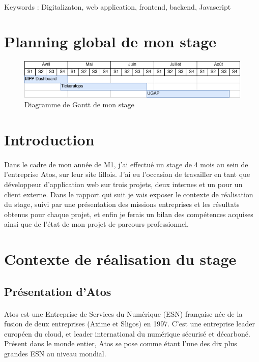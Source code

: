 \documentclass[12pt]{article}
\begin{document}
\begin {sloppypar}
\paragraph{}
Keywords : Digitalizaton, web application, frontend, backend, Javascript
\newpage

\section*{Planning global de mon stage}
\begin{figure}[h]
  \includegraphics[width=\textwidth] {gantt.png}
  \caption {Diagramme de Gantt de mon stage}
\end{figure}
\newpage

\section{Introduction}
\paragraph{}
Dans le cadre de mon année de M1, j'ai effectué un stage de 4 mois au sein de l'entreprise 
Atos, sur leur site lillois. J'ai eu l'occasion de travailler en tant que développeur d'application 
web sur trois projets, deux internes et un pour un client externe. Dans le rapport qui suit je vais exposer le contexte 
de réalisation du stage, suivi par une présentation des missions entreprises et les résultats obtenus pour chaque projet,
et enfin je ferais un bilan des compétences acquises ainsi que de l'état de mon projet de parcours professionnel. 

\section{Contexte de réalisation du stage}
\subsection{Présentation d'Atos}
\paragraph{}
Atos est une Entreprise de Services du Numérique (ESN) française née de la fusion de 
deux entreprises (Axime et Sligos) en 1997. C’est une entreprise leader européen du cloud, 
et leader international du numérique sécurisé et décarboné. Présent dans 
le monde entier, Atos se pose comme étant l’une des dix plus grandes ESN au niveau mondial.


\end{sloppypar}
\end{document}
